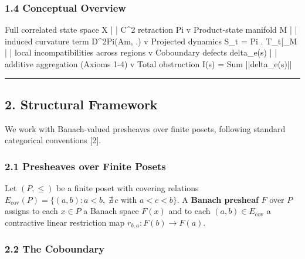 \documentclass[
]{article}
\newenvironment{Shaded}{}{}
\newcommand{\NormalTok}[1]{#1}
\begin{document}
\subsubsection{1.4 Conceptual Overview}\label{conceptual-overview}

\begin{Shaded}
\begin{Highlighting}[]
\NormalTok{Full correlated state space X}
\NormalTok{        |}
\NormalTok{        |  C\^{}2 retraction Pi}
\NormalTok{        v}
\NormalTok{Product{-}state manifold M}
\NormalTok{        |}
\NormalTok{        |  induced curvature term D\^{}2Pi(Am, .)}
\NormalTok{        v}
\NormalTok{Projected dynamics S\_t = Pi . T\_t|\_M}
\NormalTok{        |}
\NormalTok{        |  local incompatibilities across regions}
\NormalTok{        v}
\NormalTok{Coboundary defects delta\_e(s)}
\NormalTok{        |}
\NormalTok{        |  additive aggregation (Axioms 1{-}4)}
\NormalTok{        v}
\NormalTok{Total obstruction  I(s) = Sum ||delta\_e(s)||}
\end{Highlighting}
\end{Shaded}

\begin{center}\rule{0.5\linewidth}{0.5pt}\end{center}

\subsection{2. Structural Framework}\label{structural-framework}

We work with Banach-valued presheaves over finite posets, following
standard categorical conventions {[}2{]}.

\subsubsection{2.1 Presheaves over Finite
Posets}\label{presheaves-over-finite-posets}

Let \((P, \leq)\) be a finite poset with covering relations
\(E_{\text{cov}}(P) = \{(a, b) : a < b,\; \nexists\, c \text{ with } a < c < b\}\).
A \textbf{Banach presheaf} \(F\) over \(P\) assigns to each \(x \in P\)
a Banach space \(F(x)\) and to each \((a,b) \in E_{\text{cov}}\) a
contractive linear restriction map \(r_{b,a}: F(b) \to F(a)\).

\subsubsection{2.2 The Coboundary}\label{the-coboundary}
\end{document}
